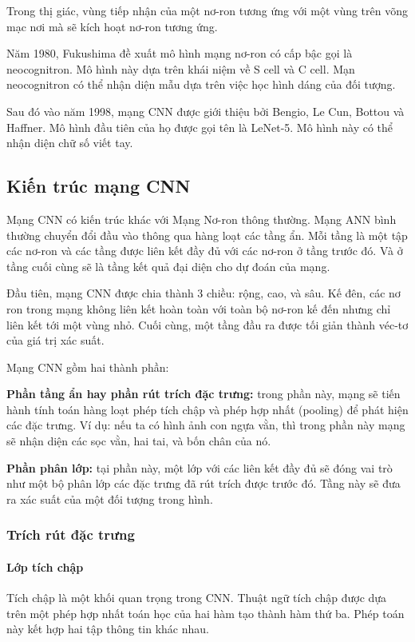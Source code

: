 Trong thị giác, vùng tiếp nhận của một nơ-ron tương ứng với một vùng trên võng mạc nơi mà sẽ kích hoạt nơ-ron tương ứng. 

Năm 1980, Fukushima đề xuất mô hình mạng nơ-ron có cấp bậc gọi là neocognitron. Mô hình này dựa trên khái niệm về S cell và C cell. Mạn neocognitron có thể nhận diện mẫu dựa trên việc học hình dáng của đối tượng. 

Sau đó vào năm 1998, mạng CNN được giới thiệu bởi Bengio, Le Cun, Bottou và Haffner. Mô hình đầu tiên của họ được gọi tên là LeNet-5. Mô hình này có thể nhận diện chữ số viết tay.

\subsection{Kiến trúc mạng CNN}
Mạng CNN có kiến trúc khác với Mạng Nơ-ron thông thường. Mạng ANN bình thường chuyển đổi đầu vào thông qua hàng loạt các tầng ẩn. Mỗi tầng là một tập các nơ-ron và các tầng được liên kết đầy đủ với các nơ-ron ở tầng trước đó. Và ở tầng cuối cùng sẽ là tầng kết quả đại diện cho dự đoán của mạng.

Đầu tiên, mạng CNN được chia thành 3 chiều: rộng, cao, và sâu. Kế đên, các nơ ron trong mạng không liên kết hoàn toàn với toàn bộ nơ-ron kế đến nhưng chỉ liên kết tới một vùng nhỏ. Cuối cùng, một tầng đầu ra được tối giản thành véc-tơ của giá trị xác suất.


Mạng CNN gồm hai thành phần:

\indent\indent \textbf{Phần tầng ẩn hay phần rút trích đặc trưng:} trong phần này, mạng sẽ tiến hành tính toán hàng loạt phép tích chập và phép hợp nhất (pooling) để phát hiện các đặc trưng. Ví dụ: nếu ta có hình ảnh con ngựa vằn, thì trong phần này mạng sẽ nhận diện các sọc vằn, hai tai, và bốn chân của nó.

\indent\indent  \textbf{Phần phân lớp:} tại phần này, một lớp với các liên kết đầy đủ sẽ đóng vai trò như một bộ phân lớp các đặc trưng đã rút trích được trước đó. Tầng này sẽ đưa ra xác suất của một đối tượng trong hình.

\subsubsection{Trích rút đặc trưng}
\paragraph{Lớp tích chập}
Tích chập là một khối quan trọng trong CNN. Thuật ngữ tích chập được dựa trên một phép hợp nhất toán học của hai hàm tạo thành hàm thứ ba. Phép toán này kết hợp hai tập thông tin khác nhau.

